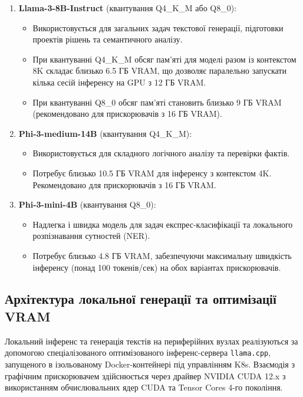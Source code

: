 \documentclass{article}
\begin{document}
\begin{enumerate}
    \item \textbf{Llama-3-8B-Instruct} (квантування Q4\_K\_M або Q8\_0):
    \begin{itemize}
        \item Використовується для загальних задач текстової генерації, підготовки проектів рішень та семантичного аналізу.
        \item При квантуванні Q4\_K\_M обсяг пам'яті для моделі разом із контекстом 8K складає близько 6.5 ГБ VRAM, що дозволяє паралельно запускати кілька сесій інференсу на GPU з 12 ГБ VRAM.
        \item При квантуванні Q8\_0 обсяг пам'яті становить близько 9 ГБ VRAM (рекомендовано для прискорювачів з 16 ГБ VRAM).
    \end{itemize}
    \item \textbf{Phi-3-medium-14B} (квантування Q4\_K\_M):
    \begin{itemize}
        \item Використовується для складного логічного аналізу та перевірки фактів.
        \item Потребує близько 10.5 ГБ VRAM для інференсу з контекстом 4K. Рекомендовано для прискорювачів з 16 ГБ VRAM.
    \end{itemize}
    \item \textbf{Phi-3-mini-4B} (квантування Q8\_0):
    \begin{itemize}
        \item Надлегка і швидка модель для задач експрес-класифікації та локального розпізнавання сутностей (NER).
        \item Потребує близько 4.8 ГБ VRAM, забезпечуючи максимальну швидкість інференсу (понад 100 токенів/сек) на обох варіантах прискорювачів.
    \end{itemize}
\end{enumerate}

\subsection{Архітектура локальної генерації та оптимізації VRAM}

Локальний інференс та генерація текстів на периферійних вузлах реалізуються за допомогою спеціалізованого оптимізованого інференс-сервера \texttt{llama.cpp}, запущеного в ізольованому Docker-контейнері під управлінням K8s. Взаємодія з графічним прискорювачем здійснюється через драйвер NVIDIA CUDA 12.x з використанням обчислювальних ядер CUDA та Tensor Cores 4-го покоління.
\end{document}
